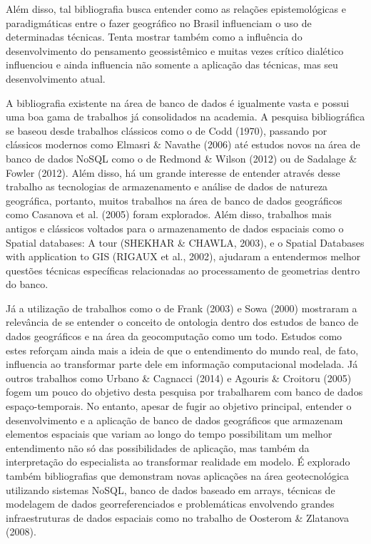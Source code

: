 Além disso, tal bibliografia busca entender como as relações epistemológicas e paradigmáticas entre o fazer geográfico no Brasil influenciam o uso de determinadas técnicas. Tenta mostrar também como a influência do desenvolvimento do pensamento geossistêmico e muitas vezes crítico dialético influenciou e ainda influencia não somente a aplicação das técnicas, mas seu desenvolvimento atual. 

A bibliografia existente na área de banco de dados é igualmente vasta e possui uma boa gama de trabalhos já consolidados na academia. A pesquisa bibliográfica se baseou desde trabalhos clássicos como o de Codd (1970)\cite{CODD}, passando por clássicos modernos como Elmasri \& Navathe (2006)\cite{ELMASRI_NAVATHE} até estudos novos na área de banco de dados NoSQL como o de Redmond \& Wilson (2012)\cite{REDMOND_WILSON} ou de Sadalage \& Fowler (2012)\cite{SADALAGE_FOWLER}. Além disso, há um grande interesse de entender através desse trabalho as tecnologias de armazenamento e análise de dados de natureza geográfica, portanto, muitos trabalhos na área de banco de dados geográficos como Casanova et al. (2005)\cite{CASANOVA_etal05} foram explorados. Além disso, trabalhos mais antigos e clássicos voltados para o armazenamento de dados espaciais como o Spatial databases: A tour (SHEKHAR \& CHAWLA, 2003)\cite{SHEKHAR_CHAWLA}, e o Spatial Databases with application to GIS (RIGAUX et al., 2002)\cite{RIGAUX_etal02}, ajudaram a entendermos melhor questões técnicas específicas relacionadas ao processamento de geometrias dentro do banco.

Já a utilização de trabalhos como o de Frank (2003)\cite{FRANK} e Sowa (2000)\cite{SOWA} mostraram a relevância de se entender o conceito de ontologia dentro dos estudos de banco de dados geográficos e na área da geocomputação como um todo. Estudos como estes reforçam ainda mais a ideia de que o entendimento do mundo real, de fato, influencia ao transformar parte dele em informação computacional modelada. Já outros trabalhos como Urbano \& Cagnacci (2014)\cite{URBANO_CAGNACCI} e Agouris \& Croitoru (2005)\cite{AGOURIS} fogem um pouco do objetivo desta pesquisa por trabalharem com banco de dados espaço-temporais. No entanto, apesar de fugir ao objetivo principal, entender o desenvolvimento e a aplicação de banco de dados geográficos que armazenam elementos espaciais que variam ao longo do tempo possibilitam um melhor entendimento não só das possibilidades de aplicação, mas também da interpretação do especialista ao transformar realidade em modelo. É explorado também bibliografias que demonstram novas aplicações na área geotecnológica utilizando sistemas NoSQL, banco de dados baseado em arrays, técnicas de modelagem de dados georreferenciados e problemáticas envolvendo grandes infraestruturas de dados espaciais como no trabalho de Oosterom \& Zlatanova (2008)\cite{OOSTEROM_ZLATANOVA}. 

